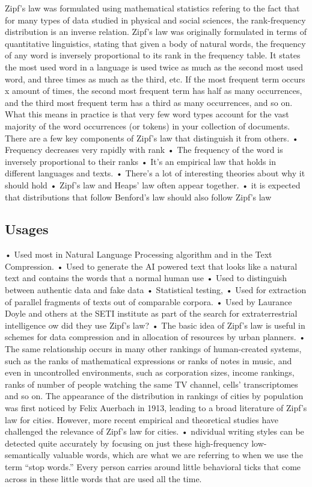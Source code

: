 \documentclass[a4paper,10pt]{article}
\begin{document}
Zipf’s law was formulated using mathematical statistics refering to the fact that for many types of data studied in  physical and social sciences, the rank-frequency distribution is an inverse relation.  Zipf's law was originally formulated in terms of quantitative linguistics, stating that given a body of natural words, the frequency of any word is inversely proportional to its rank in the frequency table.  It states the most used word in a language is used twice as much as the second most used word, and three times as much as the third, etc. If the most frequent term occurs x amount of times, the second most frequent term has half as many occurrences, and the third most frequent term has a third as many occurrences, and so on.  What this means in practice is that very few word types account for the vast majority of the word occurrences (or tokens) in your collection of documents. There are a few key components of Zipf’s law that distinguish it from others.
• Frequency decreases very rapidly with rank
• The frequency of the word is inversely proportional to their ranks
• It’s an empirical law that holds in different languages and texts. 
• There’s a lot of interesting theories about why it should hold
• Zipf's law and Heaps' law often appear together.
• it is expected that distributions that follow Benford’s law should also follow Zipf’s law



\subsection{Usages}

• Used most in Natural Language Processing algorithm and in the Text Compression. 
• Used to generate the AI powered text that looks like a natural text and contains the words that a normal human use
• Used to distinguish between authentic data and fake data
• Statistical testing, 
• Used for extraction of parallel fragments of texts out of comparable corpora.
• Used by Laurance Doyle and others at the SETI institute as part of the search for extraterrestrial intelligence ow did they use Zipf’s law?
• The basic idea of Zipf’s law is useful in schemes for data compression and in allocation of resources by urban planners.
• The same relationship occurs in many other rankings of human-created systems, such as the ranks of mathematical expressions or ranks of notes in music, and even in uncontrolled environments, such as corporation sizes, income rankings, ranks of number of people watching the same TV channel, cells' transcriptomes  and so on. The appearance of the distribution in rankings of cities by population was first noticed by Felix Auerbach in 1913, leading to a broad literature of Zipf's law for cities. However, more recent empirical and theoretical studies have challenged the relevance of Zipf's law for cities.
• ndividual writing styles can be detected quite accurately by focusing on just these high-frequency low-semantically valuable words, which are what we are referring to when we use the term “stop words.”  Every person carries around little behavioral ticks that come across in these little words that are used all the time.
\end{document}
